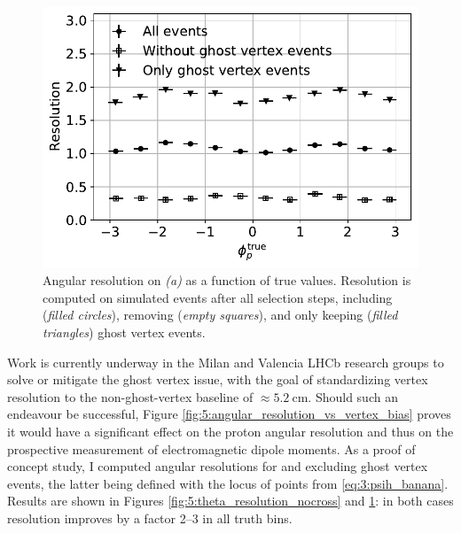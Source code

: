 \begin{figure}[t]
	\centering
	\includegraphics[width=.7\textwidth]{graphics/05-angular_distributions/MCRECO_p_phi_resolution_nocross.pdf}
	\caption{Angular resolution on \phip \textit{(a)} as a function of true values. Resolution is computed on simulated \demonstratorshort events after all selection steps, including (\textit{filled circles}), removing (\textit{empty squares}), and only keeping (\textit{filled triangles}) \lambdadecay ghost vertex events.}
	\label{fig:5:phi_resolution_nocross}
\end{figure}

Work is currently underway in the Milan and Valencia LHCb research groups to solve or mitigate the ghost vertex issue, with the goal of standardizing \lz vertex resolution to the non-ghost-vertex baseline of $\approx \SI{5.2}{\centi\meter}$.
Should such an endeavour be successful, Figure \ref{fig:5:angular_resolution_vs_vertex_bias} proves it would have a significant effect on the proton angular resolution and thus on the prospective measurement of \lz electromagnetic dipole moments.
As a proof of concept study, I computed angular resolutions for \cthetap and \phip excluding ghost vertex events, the latter being defined with the locus of points from \eqref{eq:3:psih_banana}.
Results are shown in Figures \ref{fig:5:theta_resolution_nocross} and \ref{fig:5:phi_resolution_nocross}:
in both cases resolution improves by a factor 2--3 in all truth bins.
